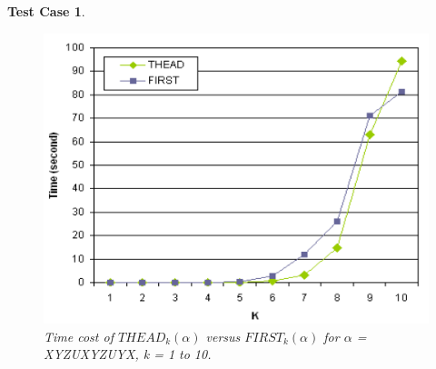 \documentclass{sig-alternate-05-2015}
\newtheorem{TestCase}{Test Case}
\begin{document}
\begin{TestCase}
\begin{figure}[h]
\centering
\includegraphics[scale=0.5]{figure4.PNG}
\caption{Time cost of $THEAD_k(\alpha)$ versus $FIRST_k(\alpha)$
for $\alpha$ = XYZUXYZUYX, k = 1 to 10.}
\label{fig:4}
\end{figure}
\end{TestCase}
\end{document}
